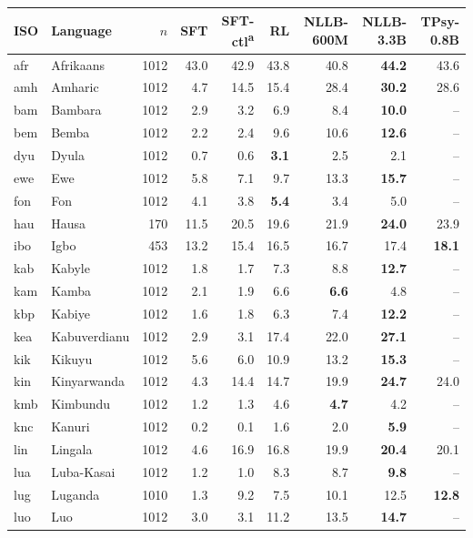 \begin{table}[t]
\centering\footnotesize
\setlength{\tabcolsep}{3pt}
\begin{tabular}{@{}llrrrrrrr@{}}
\toprule
ISO & Language & $n$ & SFT & SFT-ctl\textsuperscript{a} & RL & NLLB-600M & NLLB-3.3B & TPsy-0.8B \\
\midrule
afr & Afrikaans & 1012 & 43.0 & 42.9 & 43.8 & 40.8 & \textbf{44.2} & 43.6 \\
amh & Amharic & 1012 & 4.7 & 14.5 & 15.4 & 28.4 & \textbf{30.2} & 28.6 \\
bam & Bambara & 1012 & 2.9 & 3.2 & 6.9 & 8.4 & \textbf{10.0} & -- \\
bem & Bemba & 1012 & 2.2 & 2.4 & 9.6 & 10.6 & \textbf{12.6} & -- \\
dyu & Dyula & 1012 & 0.7 & 0.6 & \textbf{3.1} & 2.5 & 2.1 & -- \\
ewe & Ewe & 1012 & 5.8 & 7.1 & 9.7 & 13.3 & \textbf{15.7} & -- \\
fon & Fon & 1012 & 4.1 & 3.8 & \textbf{5.4} & 3.4 & 5.0 & -- \\
hau & Hausa & 170 & 11.5 & 20.5 & 19.6 & 21.9 & \textbf{24.0} & 23.9 \\
ibo & Igbo & 453 & 13.2 & 15.4 & 16.5 & 16.7 & 17.4 & \textbf{18.1} \\
kab & Kabyle & 1012 & 1.8 & 1.7 & 7.3 & 8.8 & \textbf{12.7} & -- \\
kam & Kamba & 1012 & 2.1 & 1.9 & 6.6 & \textbf{6.6} & 4.8 & -- \\
kbp & Kabiye & 1012 & 1.6 & 1.8 & 6.3 & 7.4 & \textbf{12.2} & -- \\
kea & Kabuverdianu & 1012 & 2.9 & 3.1 & 17.4 & 22.0 & \textbf{27.1} & -- \\
kik & Kikuyu & 1012 & 5.6 & 6.0 & 10.9 & 13.2 & \textbf{15.3} & -- \\
kin & Kinyarwanda & 1012 & 4.3 & 14.4 & 14.7 & 19.9 & \textbf{24.7} & 24.0 \\
kmb & Kimbundu & 1012 & 1.2 & 1.3 & 4.6 & \textbf{4.7} & 4.2 & -- \\
knc & Kanuri & 1012 & 0.2 & 0.1 & 1.6 & 2.0 & \textbf{5.9} & -- \\
lin & Lingala & 1012 & 4.6 & 16.9 & 16.8 & 19.9 & \textbf{20.4} & 20.1 \\
lua & Luba-Kasai & 1012 & 1.2 & 1.0 & 8.3 & 8.7 & \textbf{9.8} & -- \\
lug & Luganda & 1010 & 1.3 & 9.2 & 7.5 & 10.1 & 12.5 & \textbf{12.8} \\
luo & Luo & 1012 & 3.0 & 3.1 & 11.2 & 13.5 & \textbf{14.7} & -- \\

\end{tabular}
\end{table}
